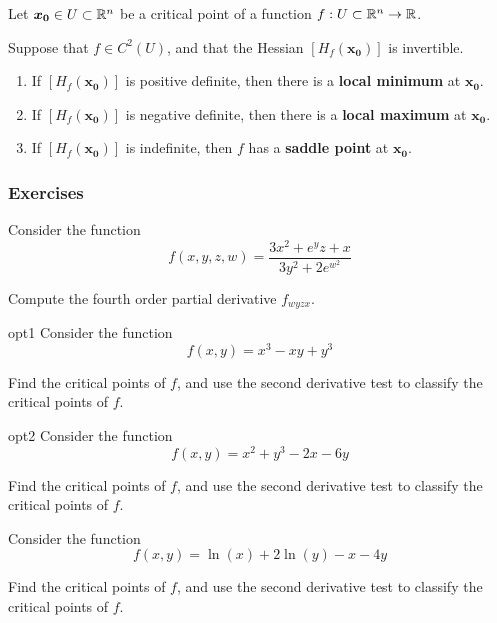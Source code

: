 \begin{theorem}

Let $\bm{x_0} \in U \subset \mathbb{R}^n$ be a critical point of a function $f : U \subset \mathbb{R}^n \to \mathbb{R}$. 

\vspace{.5em}
Suppose that $f \in C^2(U)$, and that the Hessian $[H_f(\bm{x_0})]$ is invertible.

\begin{enumerate}
    \item If $[H_f(\bm{x_0})]$ is positive definite, then there is a \textbf{local minimum} at $\bm{x_0}$.
    \item If $[H_f(\bm{x_0})]$ is negative definite, then there is a \textbf{local maximum} at $\bm{x_0}$. 
    \item If $[H_f(\bm{x_0})]$ is indefinite, then $f$ has a \textbf{saddle point} at $\bm{x_0}$. 
\end{enumerate}

\end{theorem}



\subsubsection{Exercises}

\begin{problem}
    Consider the function $$f(x,y,z,w) = \frac{3x^2 + e^yz + x}{3y^2+2e^{w^2}}$$ 

Compute the fourth order partial derivative $f_{wyzx}$.
\end{problem}

\begin{problem}{opt1}
    Consider the function $$f(x,y) = x^3 - xy +  y^3 $$
    
    Find the critical points of $f$, and use the second derivative test to classify the critical points of $f$.
\end{problem}

\begin{problem}{opt2}
    Consider the function $$f(x,y) = x^2 + y^3 - 2x - 6y$$
    
    Find the critical points of $f$, and use the second derivative test to classify the critical points of $f$.
\end{problem}

\begin{problem}
    Consider the function $$f(x,y) = \ln(x) + 2\ln(y) -x - 4y$$
    
    Find the critical points of $f$, and use the second derivative test to classify the critical points of $f$.
\end{problem}


